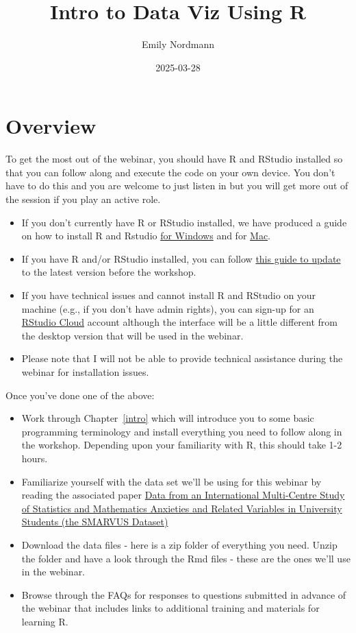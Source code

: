 \documentclass[
  oneside]{book}
\title{Intro to Data Viz Using R}
\author{Emily Nordmann}
\date{2025-03-28}
\providecommand{\tightlist}{%
  \setlength{\itemsep}{0pt}\setlength{\parskip}{0pt}}
\begin{document}
\maketitle

{
\setcounter{tocdepth}{1}
\tableofcontents
}
\chapter*{Overview}\label{overview}

To get the most out of the webinar, you should have R and RStudio installed so that you can follow along and execute the code on your own device. You don't have to do this and you are welcome to just listen in but you will get more out of the session if you play an active role.

\begin{itemize}
\tightlist
\item
  If you don't currently have R or RStudio installed, we have produced a guide on how to install R and Rstudio \href{https://psyteachr.github.io/RSetGo/installing-r-windows.html}{for Windows} and for \href{https://psyteachr.github.io/RSetGo/installing-r-mac.html}{Mac}.
\item
  If you have R and/or RStudio installed, you can follow \href{https://psyteachr.github.io/RSetGo/updating-r.html}{this guide to update} to the latest version before the workshop.
\item
  If you have technical issues and cannot install R and RStudio on your machine (e.g., if you don't have admin rights), you can sign-up for an \href{https://rstudio.cloud/}{RStudio Cloud} account although the interface will be a little different from the desktop version that will be used in the webinar.
\item
  Please note that I will not be able to provide technical assistance during the webinar for installation issues.
\end{itemize}

Once you've done one of the above:

\begin{itemize}
\tightlist
\item
  Work through Chapter~\ref{intro} which will introduce you to some basic programming terminology and install everything you need to follow along in the workshop. Depending upon your familiarity with R, this should take 1-2 hours.
\item
  Familiarize yourself with the data set we'll be using for this webinar by reading the associated paper \href{https://openpsychologydata.metajnl.com/articles/10.5334/jopd.80}{Data from an International Multi-Centre Study of Statistics and Mathematics Anxieties and Related Variables in University Students (the SMARVUS Dataset)}
\item
  Download the data files - here is a zip folder of everything you need. Unzip the folder and have a look through the Rmd files - these are the ones we'll use in the webinar.
\item
  Browse through the FAQs for responses to questions submitted in advance of the webinar that includes links to additional training and materials for learning R.
\end{itemize}
\end{document}
